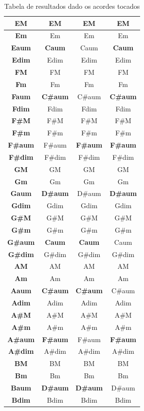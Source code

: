 \begin{table}[ht!]
{\begin{tabular}{ | c | c | c | c |}
  \textbf{EM} & EM & EM & EM \\
  \hline
  \textbf{Em} & Em & Em & Em \\
  \hline
  \textbf{Eaum} & \textbf{Caum} & Caum & \textbf{Caum} \\
  \hline
  \textbf{Edim} & Edim & Edim & Edim \\
  \hline
  \textbf{FM} & FM & FM & FM \\
  \hline
  \textbf{Fm} & Fm & Fm & Fm \\
  \hline
  \textbf{Faum} & \textbf{C\#aum} & C\#aum & \textbf{C\#aum} \\
  \hline
  \textbf{Fdim} & Fdim & Fdim & Fdim \\
  \hline
  \textbf{F\#M} & F\#M & F\#M & F\#M \\
  \hline
  \textbf{F\#m} & F\#m & F\#m & F\#m \\
  \hline
  \textbf{F\#aum} & F\#aum & \textbf{F\#aum} & \textbf{F\#aum} \\
  \hline
  \textbf{F\#dim} & F\#dim & F\#dim & F\#dim \\
  \hline
  \textbf{GM} & GM & GM & GM \\
  \hline
  \textbf{Gm} & Gm & Gm & Gm \\
  \hline
  \textbf{Gaum} & \textbf{D\#aum} & D\#aum & \textbf{D\#aum} \\
  \hline
  \textbf{Gdim} & Gdim & Gdim & Gdim \\
  \hline
  \textbf{G\#M} & G\#M & G\#M & G\#M \\
  \hline
  \textbf{G\#m} & G\#m & G\#m & G\#m \\
  \hline
  \textbf{G\#aum} & \textbf{Caum} & \textbf{Caum} & Caum \\
  \hline
  \textbf{G\#dim} & G\#dim & G\#dim & G\#dim \\
  \hline
  \textbf{AM} & AM & AM & AM \\
  \hline
  \textbf{Am} & Am & Am & Am \\
  \hline
  \textbf{Aaum} & \textbf{C\#aum} & \textbf{C\#aum} & C\#aum \\
  \hline
  \textbf{Adim} & Adim & Adim & Adim \\
  \hline
  \textbf{A\#M} & A\#M & A\#M & A\#M \\
  \hline
  \textbf{A\#m} & A\#m & A\#m & A\#m \\
  \hline
  \textbf{A\#aum} & \textbf{F\#aum} & F\#aum & \textbf{F\#aum} \\
  \hline
  \textbf{A\#dim} & A\#dim & A\#dim & A\#dim \\
  \hline
  \textbf{BM} & BM & BM & BM \\
  \hline
  \textbf{Bm} & Bm & Bm & Bm \\
  \hline
  \textbf{Baum} & \textbf{D\#aum} & \textbf{D\#aum} & D\#aum \\
  \hline
  \textbf{Bdim} & Bdim & Bdim & Bdim \\
  \hline
\end{tabular}
}
\caption{Tabela de resultados dado os acordes tocados}
\label{tab:label_test}
\end{table}

